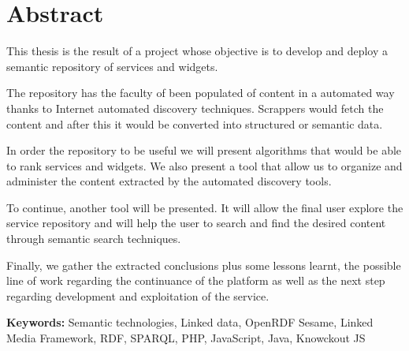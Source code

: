 \cleardoublepage
{}
\chapter*{Abstract}

This thesis is the result of a project whose objective is to develop and deploy a semantic repository of services and widgets.

The repository has the faculty of been populated of content in a automated way thanks to Internet automated discovery techniques. Scrappers would fetch the content and after this it would be converted into structured or semantic data.

In order the repository to be useful we will present algorithms that would be able to rank services and widgets. We also present a tool that allow us to organize and administer the content extracted by the automated discovery tools.

To continue, another tool will be presented. It will allow the final user explore the service repository and will help the user to search and find the desired content through semantic search techniques.

Finally, we gather the extracted conclusions plus some lessons learnt, the possible line of work regarding the continuance of the platform as well as the next step regarding development and exploitation of the service.


\vfill
\textbf{Keywords:} Semantic technologies, Linked data, OpenRDF Sesame, Linked Media Framework, RDF, SPARQL, PHP, JavaScript, Java, Knowckout JS